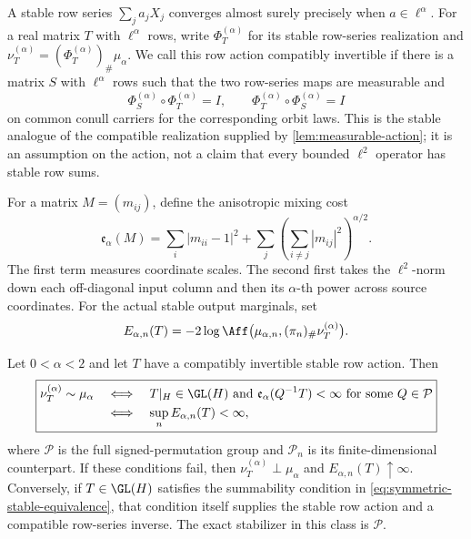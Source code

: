 A stable row series \(\sum_ja_jX_j\) converges almost surely precisely when
\(a\in\ell^\alpha\).
For a real matrix \(T\) with \(\ell^\alpha\) rows, write
\(\Phi_T^{(\alpha)}\) for its stable row-series realization and
\(\nu_T^{(\alpha)}=(\Phi_T^{(\alpha)})_\#\mu_\alpha\).
We call this row action compatibly invertible if there is a matrix \(S\)
with \(\ell^\alpha\) rows such that the two row-series maps are measurable
and
\[
 \Phi_S^{(\alpha)}\circ\Phi_T^{(\alpha)}=I,
 \qquad
 \Phi_T^{(\alpha)}\circ\Phi_S^{(\alpha)}=I
\]
on common conull carriers for the corresponding orbit laws.
This is the stable analogue of the compatible realization supplied by
\cref{lem:measurable-action}; it is an assumption on the action, not a claim
that every bounded \(\ell^2\) operator has stable row sums.

For a matrix \(M=(m_{ij})\), define the anisotropic mixing cost
\begin{equation}
 \mathfrak e_\alpha(M)
 =\sum_i|m_{ii}-1|^2
  +\sum_j\left(\sum_{i\ne j}|m_{ij}|^2\right)^{\alpha/2}.
 \label{eq:stable-mixing-cost}
\end{equation}
The first term measures coordinate scales.
The second first takes the \(\ell^2\)-norm down each off-diagonal input
column and then its \(\alpha\)-th power across source coordinates.
For the actual stable output marginals, set
\begin{equation}
 E_{\alpha,n}(T)
 =-2\log\Aff\bigl(
       \mu_{\alpha,n},(\pi_n)_\#\nu_T^{(\alpha)}\bigr).
 \label{eq:stable-projected-hellinger-energy}
\end{equation}

\begin{theorem}
\label{thm:symmetric-stable-equivalence}
Let \(0<\alpha<2\) and let \(T\) have a compatibly invertible stable row
action.  Then
\begin{equation}
 \boxed{\begin{aligned}
 \nu_T^{(\alpha)}\sim\mu_\alpha
 &\quad\Longleftrightarrow\quad
 T|_H\in\GL(H)\ \text{and}\
 \mathfrak e_\alpha(Q^{-1}T)<\infty
       \ \text{for some }Q\in\mathcal P\\
 &\quad\Longleftrightarrow\quad
 \sup_nE_{\alpha,n}(T)<\infty,
 \end{aligned}}
 \label{eq:symmetric-stable-equivalence}
\end{equation}
where \(\mathcal P\) is the full signed-permutation group and
\(\mathcal P_n\) is its finite-dimensional counterpart.
If these conditions fail, then
\(\nu_T^{(\alpha)}\perp\mu_\alpha\) and
\(E_{\alpha,n}(T)\uparrow\infty\).
Conversely, if \(T\in\GL(H)\) satisfies the summability condition in
\eqref{eq:symmetric-stable-equivalence}, that condition itself supplies the
stable row action and a compatible row-series inverse.
The exact stabilizer in this class is \(\mathcal P\).
\end{theorem}

